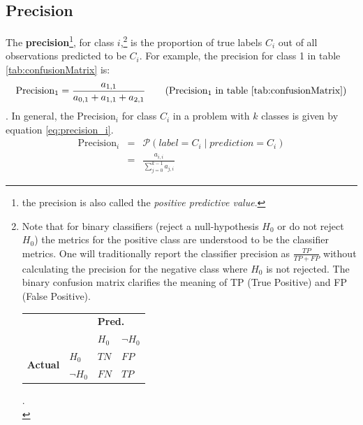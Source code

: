 \subsection{Precision}
\par{
    The \textbf{precision}\footnote{the precision is also called the \textit{positive predictive value}.}, for class $i$,\footnote{
        Note that for binary classifiers (reject a null-hypothesis $H_0$ or do not reject $H_0$) the metrics for the positive class are understood to be the classifier metrics. 
        One will traditionally report the classifier precision as $\frac{TP}{TP+FP}$ without calculating the precision for the negative class where $H_0$ is not rejected.
        The binary confusion matrix clarifies the meaning of TP (True Positive) and FP (False Positive).
        \begin{tabular}{clll}
            \multicolumn{1}{l}{}                &                        & \multicolumn{2}{l}{\textbf{Pred.}}           \\
            \multicolumn{1}{l}{}                &                        & $H_0$   & $\neg H_0$                         \\ \cline{3-4} 
            \multirow{2}{*}{\textbf{Actual}}   & \multicolumn{1}{l|}{$H_0$} & $TN$ & \multicolumn{1}{l|}{$FP$} \\
                                                & \multicolumn{1}{l|}{$\neg H_0$} & $FN$  & \multicolumn{1}{l|}{$TP$ } \\ \hline
            \end{tabular}.\\
    } is the proportion of true labels $C_i$ out of all observations predicted to be $C_i$. 
    For example, the precision for class 1 in table \ref{tab:confusionMatrix} is:
    \begin{equation}
        \text{Precision}_1 = \frac{a_{1,1}}{a_{0,1} + a_{1,1} + a_{2,1}} \tag{Precision$_1$ in table \ref{tab:confusionMatrix}}
    \end{equation}.
    In general, the Precision$_i$ for class $C_i$ in a problem with $k$ classes is given by equation \ref{eq:precision_i}.
    \begin{eqnarray}
        \text{Precision}_i &=& \mathcal{P} \left( label = C_i \mid prediction = C_i \right) \\
        &=& \frac{a_{i, i}}{\sum_{j=0}^{k-1} a_{j,i}} \label{eq:precision_i}
    \end{eqnarray}
}
